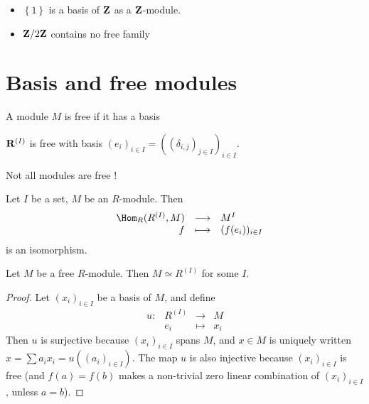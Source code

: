 \begin{ex}
\begin{itemize}
    \item $ \left\{ 1 \right\} $ is a basis of $\mathbf Z$ as a $\mathbf Z$-module.
    \item $\mathbf Z / 2\mathbf Z$ contains no free family
\end{itemize}
\end{ex}

\section{Basis and free modules}

\begin{dfn}
A module $M$ is free if it has a basis
\end{dfn}

\begin{ex}
$\mathbf R^{(I)}$ is free with basis $(e_i)_{i \in I}=((\delta_{i,j})_{j \in  I})_{i \in  I}$.
\end{ex}

\begin{rem}
Not all modules are free !
\end{rem}

\begin{thm}
Let $I$ be a set, $M$ be an $R$-module. Then \[
\begin{array}{rrcl}
    & \Hom_R(R^{(I)},M) & \longrightarrow & M^I \\
    & f & \longmapsto & \displaystyle (f(e_i))_{i \in  I}
\end{array}
\] 
is an isomorphism.
\end{thm}

\begin{cor}
    Let $M$ be a free $R$-module. Then $M\simeq R^{(I)}$ for some $I$.
\end{cor}

\begin{proof}
Let $(x_i)_{i \in  I}$ be a basis of $M$, and define  \[
\begin{array}{rrcl}
    u:& R^{(I)} & \longrightarrow & M \\
    & e_i & \longmapsto & \displaystyle x_i
\end{array}
\] 
Then $u$ is surjective because $(x_i) _{i \in  I}$ spans $M$, and $x \in M$ is uniquely written $x=\sum a_ix_i = u((a_i)_{i \in I})$.
The map $u$ is also injective because $(x_i)_{i \in  I}$ is free (and $f(a)=f(b)$ makes a non-trivial zero linear combination of $(x_i)_{i \in  I}$, unless $a=b$).
\end{proof}

